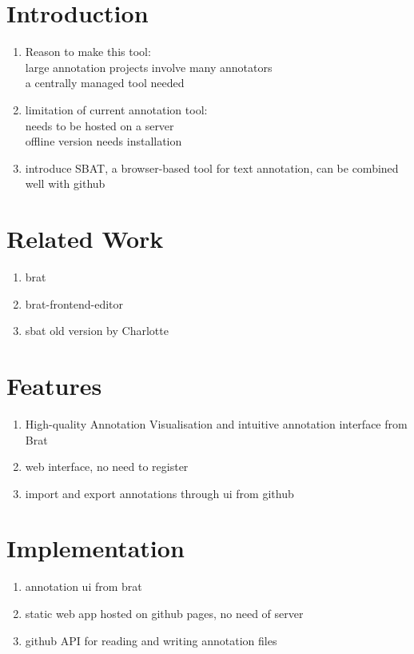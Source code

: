 \documentclass[a4paper]{article}
\begin{document}
\section{Introduction}
\begin{enumerate}
\item Reason to make this tool: \\
large annotation projects involve many annotators\\
a centrally managed tool needed\\
\item limitation of current annotation tool:\\ 
needs to be hosted on a server\\
offline version needs installation\\
\item introduce SBAT, a browser-based tool for text annotation, can be combined well with github
\end{enumerate}
\section{Related Work}
\begin{enumerate}
\item brat
\item brat-frontend-editor
\item sbat old version by Charlotte
\end{enumerate}
\section{Features}
\begin{enumerate}
\item High-quality Annotation Visualisation and intuitive annotation interface from Brat
\item web interface, no need to register
\item import and export annotations through ui from github
\end{enumerate}
\section{Implementation}
\begin{enumerate}
\item annotation ui from brat
\item static web app hosted on github pages, no need of server
\item github API for reading and writing annotation files
\end{enumerate}
\end{document}
